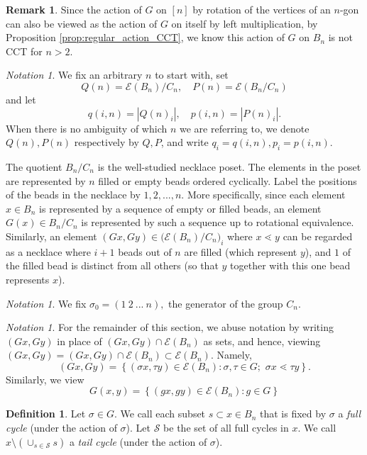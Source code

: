 \documentclass[10 pt]{amsart}
\theoremstyle{plain}
\theoremstyle{definition}
\newtheorem{defn}[thm]{Definition}
\newtheorem{rem}[thm]{Remark}
\theoremstyle{remark}
\newtheorem{note}[thm]{Notation}
\numberwithin{equation}{section}
\begin{document}
\begin{rem}
Since the action of $G$ on $[n]$ by rotation of the vertices of an $n$-gon can also be viewed as the action of $G$ on itself by left multiplication, by Proposition \ref{prop:regular_action_CCT}, we know this action of $G$ on $B_n$ is not CCT for $n > 2.$
\end{rem}


\begin{note} We fix an arbitrary $n$ to start with,  set $$Q(n) =  \mathcal E (B_n)/C_{n}, \quad P(n) =  \mathcal E(B_n/C_{n})$$ and let $$q (i, n) =|Q(n)_i|, \quad p (i, n) =|P(n)_i|. $$  When there is no ambiguity of which $n$ we are referring to, we denote $Q(n), P(n)$ respectively by $Q, P$, and write $q_i = q(i, n), p_i = p (i, n)$.
\end{note}

The quotient $B_n /C_n$ is the well-studied necklace poset. The elements in the poset are represented by $n$ filled or empty beads ordered cyclically. Label the positions of the beads in the necklace by $1, 2, ..., n$. More specifically, since each element $x \in B_n$ is represented by a sequence of empty or filled beads, an element $G(x) \in B_n/C_n$ is represented by such a sequence up to rotational equivalence.  Similarly, an element $(Gx, Gy) \in \big( \mathcal E(B_n)/C_n\big)_{i}$ where $x \lessdot y$ can be regarded as a necklace where $i+1$ beads out of $n$ are filled (which represent $y$), and $1$ of the filled bead is distinct from all others (so that $y$ together with this one bead represents $x$).
 
\begin{note}
We fix $\sigma_0 = (1 \: 2 \: ... \: n),$ the generator of the group $C_n$.
\end{note}


\begin{note}
For the remainder of this section, we abuse notation by writing $(Gx, Gy)$ in place of $(Gx, Gy) \cap  \mathcal E(B_n)$ as sets, and hence, viewing $(Gx, Gy) = (Gx, Gy) \cap  \mathcal E(B_n)\subset  \mathcal E(B_n).$ Namely, $$(Gx, Gy) = \left\{ (\sigma x, \tau y) \in  \mathcal E (B_n) : \sigma, \tau \in G; \, \, \sigma x \lessdot \tau y  \right\}.$$ Similarly, we view $$G(x, y) = \left\{ (gx , g y) \in  \mathcal E (B_n) : g \in G \right\} $$
\end{note}

\begin{defn}
Let  $\sigma \in G.$ We call each subset $s \subset x \in B_n$ that is fixed by $\sigma$ a \textit{full cycle} (under the action of $\sigma$). Let $\mathcal S$ be the set of all full cycles in $x$. We call $x \setminus \left(\cup_{s \in \mathcal S}  s \right)$ a \textit{tail cycle} (under the action of $\sigma$).  
\end{defn}
\end{document}

